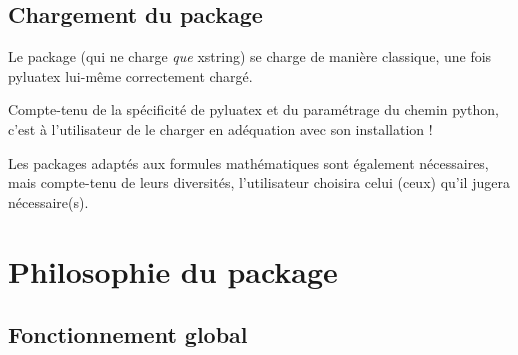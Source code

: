 \documentclass[french,a4paper,11pt]{article}
\begin{document}
\subsection{Chargement du package}

\begin{importantblock}
Le package (qui ne charge \textit{que} \textsf{xstring}) se charge de manière classique, une fois \textsf{pyluatex} lui-même correctement chargé.

\smallskip

Compte-tenu de la spécificité de \textsf{pyluatex} et du paramétrage du chemin \textsf{python}, c'est à l'utilisateur de le charger en adéquation avec son installation !

\smallskip

Les packages adaptés aux formules mathématiques sont également nécessaires, mais compte-tenu de leurs diversités, l'utilisateur choisira celui (ceux) qu'il jugera nécessaire(s).
\end{importantblock}

\begin{bloctext}
\usepackage{mathtools}                           %
\usepackage[executable=python.exe]{pyluatex}     %
\usepackage{SympyCalc}
\end{bloctext}

\newpage

\section{Philosophie du package}

\subsection{Fonctionnement global}
\end{document}
